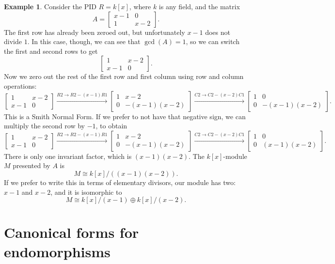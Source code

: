 \documentclass[12pt]{report}
\numberwithin{equation}{section}
\numberwithin{theorem}{chapter}
\theoremstyle{definition}
\newtheorem{example}[theorem]{Example}
\newtheorem*{basic properties}{Basic Properties}
\newtheorem*{Important Remark}{Important Remark}
\begin{document}
\begin{example}
Consider the PID $R = k[x]$, where $k$ is any field, and the matrix
$$A = \begin{bmatrix} x-1 & 0 \\ 1 & x-2 \end{bmatrix}.$$
The first row has already been zeroed out, but unfortunately $x-1$ does not divide $1$. In this case, though, we can see that $\gcd(A) = 1$, so we can switch the first and second rows to get
$$\begin{bmatrix} 1 & x-2 \\ x-1 & 0 \end{bmatrix}.$$
Now we zero out the rest of the first row and first column using row and column operations:
$$\begin{bmatrix} 1 & x-2 \\ x-1 & 0 \end{bmatrix} \xrightarrow{R2 \to R2 - (x-1)R1} \begin{bmatrix} 1 & x-2 \\ 0 & -(x-1)(x-2) \end{bmatrix} \xrightarrow{C2 \to C2 - (x-2)C1} \begin{bmatrix} 1 & 0 \\ 0 & -(x-1)(x-2) \end{bmatrix}.$$
This is a Smith Normal Form. If we prefer to not have that negative sign, we can multiply the second row by $-1$, to obtain
$$\begin{bmatrix} 1 & x-2 \\ x-1 & 0 \end{bmatrix} \xrightarrow{R2 \to R2 - (x-1)R1} \begin{bmatrix} 1 & x-2 \\ 0 & -(x-1)(x-2) \end{bmatrix} \xrightarrow{C2 \to C2 - (x-2)C1} \begin{bmatrix} 1 & 0 \\ 0 & (x-1)(x-2) \end{bmatrix}.$$
There is only one invariant factor, which is $(x-1)(x-2)$. The $k[x]$-module $M$ presented by $A$ is
$$M \cong k[x]/((x-1)(x-2)).$$
If we prefer to write this in terms of elementary divisors, our module has two: $x-1$ and $x-2$, and it is isomorphic to
$$M \cong k[x]/(x-1) \oplus k[x]/(x-2).$$
\end{example}







\chapter{Canonical forms for endomorphisms} 
\end{document}
